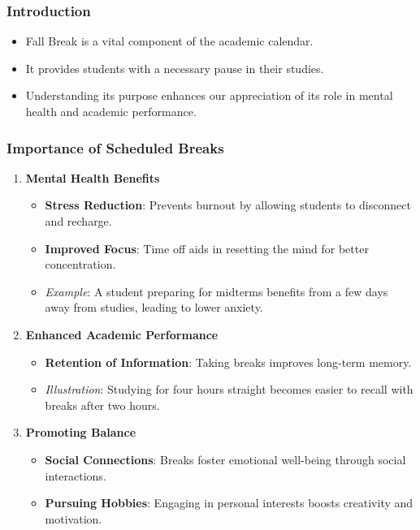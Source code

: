 \documentclass[aspectratio=169]{beamer}
\begin{document}
\begin{frame}[fragile]
    \frametitle{Introduction}
    \begin{itemize}
        \item Fall Break is a vital component of the academic calendar.
        \item It provides students with a necessary pause in their studies.
        \item Understanding its purpose enhances our appreciation of its role in mental health and academic performance.
    \end{itemize}
\end{frame}

\begin{frame}[fragile]
    \frametitle{Importance of Scheduled Breaks}
    \begin{enumerate}
        \item \textbf{Mental Health Benefits}
        \begin{itemize}
            \item \textbf{Stress Reduction}: Prevents burnout by allowing students to disconnect and recharge.
            \item \textbf{Improved Focus}: Time off aids in resetting the mind for better concentration.
            \item \textit{Example}: A student preparing for midterms benefits from a few days away from studies, leading to lower anxiety.
        \end{itemize}
        
        \item \textbf{Enhanced Academic Performance}
        \begin{itemize}
            \item \textbf{Retention of Information}: Taking breaks improves long-term memory.
            \item \textit{Illustration}: Studying for four hours straight becomes easier to recall with breaks after two hours.
        \end{itemize}
        
        \item \textbf{Promoting Balance}
        \begin{itemize}
            \item \textbf{Social Connections}: Breaks foster emotional well-being through social interactions.
            \item \textbf{Pursuing Hobbies}: Engaging in personal interests boosts creativity and motivation.
        \end{itemize}
    \end{enumerate}
\end{frame}
\end{document}
